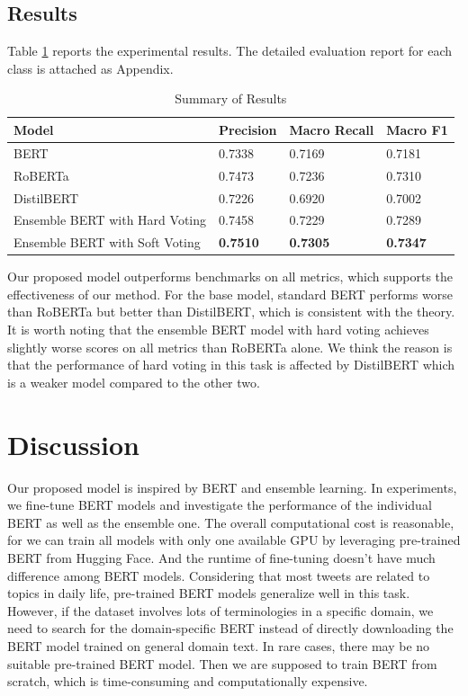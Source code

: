 \documentclass[runningheads]{llncs}
\begin{document}
\subsection{Results}
Table \ref{tab:results} reports the experimental results. The detailed evaluation report for each class is attached as Appendix.

\begin{table}[!ht]
	\centering
	\caption{Summary of Results}
	\label{tab:results}
	\begin{tabular}{llll}
		\toprule
		\textbf{Model}       & \textbf{Precision} & \textbf{Macro Recall} & \textbf{Macro F1} \\ 
		\midrule
		BERT        & 0.7338     & 0.7169  & 0.7181    \\
		RoBERTa     & 0.7473     & 0.7236  & 0.7310    \\
		DistilBERT  & 0.7226     & 0.6920  & 0.7002    \\
		Ensemble BERT with Hard Voting & 0.7458     & 0.7229  & 0.7289    \\
        Ensemble BERT with Soft Voting & \textbf{0.7510}     & \textbf{0.7305}  & \textbf{0.7347}    \\ 
		\bottomrule
	\end{tabular}
\end{table}

Our proposed model outperforms benchmarks on all metrics, which supports the effectiveness of our method. For the base model, standard BERT performs worse than RoBERTa but better than DistilBERT, which is consistent with the theory. It is worth noting that the ensemble BERT model with hard voting achieves slightly worse scores on all metrics than RoBERTa alone. We think the reason is that the performance of hard voting in this task is affected by DistilBERT which is a weaker model compared to the other two.

\section{Discussion}
Our proposed model is inspired by BERT and ensemble learning. In experiments, we fine-tune BERT models and investigate the performance of the individual BERT as well as the ensemble one. The overall computational cost is reasonable, for we can train all models with only one available GPU by leveraging pre-trained BERT from Hugging Face. And the runtime of fine-tuning doesn't have much difference among BERT models. Considering that most tweets are related to topics in daily life, pre-trained BERT models generalize well in this task. However, if the dataset involves lots of terminologies in a specific domain, we need to search for the domain-specific BERT instead of directly downloading the BERT model trained on general domain text. In rare cases, there may be no suitable pre-trained BERT model. Then we are supposed to train BERT from scratch, which is time-consuming and computationally expensive.
\end{document}
